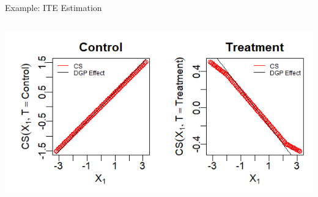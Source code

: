 \documentclass[onlytextwidth,english]{beamer}\usepackage[]{graphicx}\usepackage[]{xcolor}
\begin{document}
\begin{frame}{Example: ITE Estimation}
\begin{columns}
\begin{column}{0.48\textwidth}
\centering
\includegraphics[width=\linewidth]{img/CS_T_X1.png}
\end{column}

\end{columns}



\end{frame}
\end{document}

